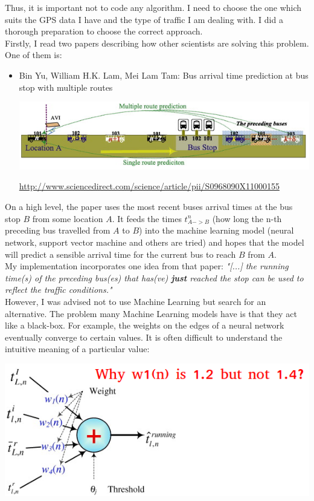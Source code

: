 \documentclass[12pt,a4paper,oneside,openright]{report}
\begin{document}
Thus, it is important not to code any algorithm. I need to choose the one which suits
the GPS data I have and the type of traffic I am dealing with. I did a thorough preparation
to choose the correct approach. \\

Firstly, I read two papers describing how other scientists are solving this problem.
One of them is:

\begin{itemize}

\item Bin Yu, William H.K. Lam, Mei Lam Tam: Bus arrival time prediction at
bus stop with multiple routes 

\includegraphics[width=\textwidth]{figs/paper.png}

\textcolor{blue}{\url{http://www.sciencedirect.com/science/article/pii/S0968090X11000155}}

\end{itemize}

On a high level, the paper uses the most recent buses arrival times at the bus stop $B$
from some location $A$. It feeds the times $t^{n}_{A->B}$ (how long the n-th
preceding bus travelled from $A$ to $B$) into the machine learning model (neural network,
support vector machine and others are tried) and hopes that the model will predict a
sensible arrival time for the current bus to reach $B$ from $A$. \\

My implementation incorporates one idea from that paper:
\textit{"[...] the running time(s) of the preceding bus(es) that has(ve) \textbf{just}
reached the stop can be used to reflect the traffic conditions."} \\

However, I was advised not to use Machine Learning but search for an alternative.
The problem many Machine Learning models have is that they act like a black-box. For example,
the weights on the edges of a neural network eventually converge to certain values. It is often
difficult to understand the intuitive meaning of a particular value:

\includegraphics[width=\textwidth]{figs/ann.png} \\
\end{document}
